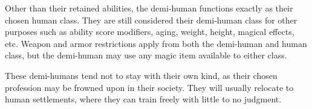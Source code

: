 \begin{multicols*}{2}
Other than their retained abilities, the demi-human functions exactly as their chosen human class. They are still considered their demi-human class for other purposes such as ability score modifiers, aging, weight, height, magical effects, etc. Weapon and armor restrictions apply from both the demi-human and human class, but the demi-human may use any magic item available to either class.

These demi-humans tend not to stay with their own kind, as their chosen profession may be frowned upon in their society. They will usually relocate to human settlements, where they can train freely with little to no judgment.
\end{multicols*}

